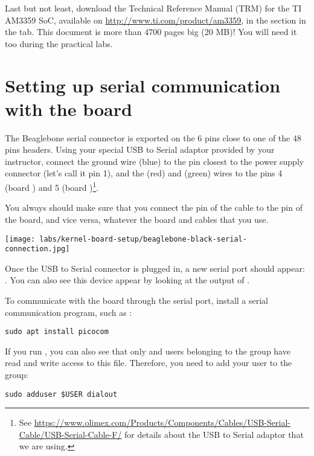 Last but not least, download the Technical Reference Manual (TRM) for
the TI AM3359 SoC, available on \url{http://www.ti.com/product/am3359},
in the  section in the  tab.
This document is more than 4700 pages big (20 MB)! You will need it
too during the practical labs.

\section{Setting up serial communication with the board}

The Beaglebone serial connector is exported on the 6 pins close to one
of the 48 pins headers. Using your special USB to Serial adaptor provided
by your instructor, connect the ground wire (blue) to the pin closest
to the power supply connector (let's call it pin 1), and the  (red)
and  (green) wires to the pins 4 (board ) and
5 (board )\footnote{See
\url{https://www.olimex.com/Products/Components/Cables/USB-Serial-Cable/USB-Serial-Cable-F/}
for details about the USB to Serial adaptor that we are using.}.

You always should make sure that you connect the  pin of the cable
to the  pin of the board, and vice versa, whatever the board and
cables that you use.

\begin{center}
\texttt{[image: labs/kernel-board-setup/beaglebone-black-serial-connection.jpg]}
\end{center}

Once the USB to Serial connector is plugged in, a new serial port
should appear: .  You can also see this device
appear by looking at the output of .

To communicate with the board through the serial port, install a
serial communication program, such as :

\begin{verbatim}
sudo apt install picocom
\end{verbatim}

If you run , you can also see that only
 and users belonging to the  group have
read and write access to this file. Therefore, you need to add your user
to the  group:

\begin{verbatim}
sudo adduser $USER dialout
\end{verbatim}

